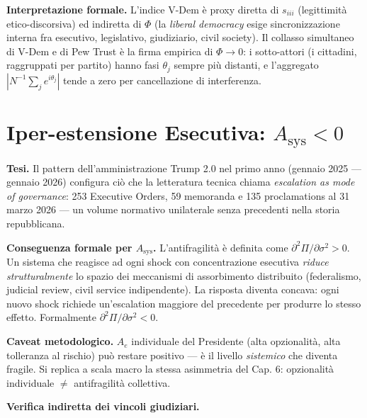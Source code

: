 \Hypoth{} \textbf{Interpretazione formale.} L'indice V-Dem è proxy
diretta di \(s_{iii}\) (legittimità etico-discorsiva) ed indiretta di
\(\Phi\) (la \emph{liberal democracy} esige sincronizzazione interna fra
esecutivo, legislativo, giudiziario, civil society). Il collasso
simultaneo di V-Dem e di Pew Trust è la firma empirica di
\(\Phi \to 0\): i sotto-attori (i cittadini, raggruppati per partito)
hanno fasi \(\theta_j\) sempre più distanti, e l'aggregato
\(|N^{-1}\sum_j e^{i\theta_j}|\) tende a zero per cancellazione di
interferenza.



\section{\texorpdfstring{Iper-estensione Esecutiva:
\(A_{\text{sys}} < 0\)}{Iper-estensione Esecutiva: A\_\{\textbackslash text\{sys\}\} \textless{} 0}}\label{iper-estensione-esecutiva-a_textsys-0}

\Hypoth{} \textbf{Tesi.} Il pattern dell'amministrazione Trump 2.0 nel
primo anno (gennaio 2025 --- gennaio 2026) configura ciò che la
letteratura tecnica chiama \emph{escalation as mode of governance}: 253
Executive Orders, 59 memoranda e 135 proclamations al 31 marzo 2026 ---
un volume normativo unilaterale senza precedenti nella storia
repubblicana.

\Proved{} \textbf{Conseguenza formale per \(A_{\text{sys}}\).}
L'antifragilità è definita come
\(\partial^2 \Pi / \partial \sigma^2 > 0\). Un sistema che reagisce ad
ogni shock con concentrazione esecutiva \emph{riduce strutturalmente} lo
spazio dei meccanismi di assorbimento distribuito (federalismo, judicial
review, civil service indipendente). La risposta diventa concava: ogni
nuovo shock richiede un'escalation maggiore del precedente per produrre
lo stesso effetto. Formalmente
\(\partial^2 \Pi / \partial \sigma^2 < 0\).

\Conj{} \textbf{Caveat metodologico.} \(A_e\) individuale del Presidente
(alta opzionalità, alta tolleranza al rischio) può restare positivo ---
è il livello \emph{sistemico} che diventa fragile. Si replica a scala
macro la stessa asimmetria del Cap. 6: opzionalità individuale \(\neq\)
antifragilità collettiva.

\Proved{} \textbf{Verifica indiretta dei vincoli giudiziari.}

